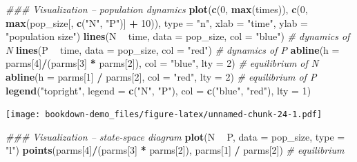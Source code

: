 \documentclass[
]{book}
\newenvironment{Shaded}{\begin{snugshade}}{\end{snugshade}}
\newcommand{\CommentTok}[1]{\textcolor[rgb]{0.56,0.35,0.01}{\textit{#1}}}
\newcommand{\DataTypeTok}[1]{\textcolor[rgb]{0.13,0.29,0.53}{#1}}
\newcommand{\DecValTok}[1]{\textcolor[rgb]{0.00,0.00,0.81}{#1}}
\newcommand{\KeywordTok}[1]{\textcolor[rgb]{0.13,0.29,0.53}{\textbf{#1}}}
\newcommand{\NormalTok}[1]{#1}
\newcommand{\OperatorTok}[1]{\textcolor[rgb]{0.81,0.36,0.00}{\textbf{#1}}}
\newcommand{\StringTok}[1]{\textcolor[rgb]{0.31,0.60,0.02}{#1}}
\begin{document}
\begin{Shaded}
\begin{Highlighting}[]
\CommentTok{### Visualization -- population dynamics}
\KeywordTok{plot}\NormalTok{(}\KeywordTok{c}\NormalTok{(}\DecValTok{0}\NormalTok{, }\KeywordTok{max}\NormalTok{(times)), }\KeywordTok{c}\NormalTok{(}\DecValTok{0}\NormalTok{, }\KeywordTok{max}\NormalTok{(pop_size[, }\KeywordTok{c}\NormalTok{(}\StringTok{"N"}\NormalTok{, }\StringTok{"P"}\NormalTok{)] }\OperatorTok{+}\StringTok{ }\DecValTok{10}\NormalTok{)), }\DataTypeTok{type =} \StringTok{"n"}\NormalTok{, }\DataTypeTok{xlab =} \StringTok{"time"}\NormalTok{, }\DataTypeTok{ylab =} \StringTok{"population size"}\NormalTok{)}
\KeywordTok{lines}\NormalTok{(N }\OperatorTok{~}\StringTok{ }\NormalTok{time, }\DataTypeTok{data =}\NormalTok{ pop_size, }\DataTypeTok{col =} \StringTok{"blue"}\NormalTok{) }\CommentTok{# dynamics of N}
\KeywordTok{lines}\NormalTok{(P }\OperatorTok{~}\StringTok{ }\NormalTok{time, }\DataTypeTok{data =}\NormalTok{ pop_size, }\DataTypeTok{col =} \StringTok{"red"}\NormalTok{) }\CommentTok{# dynamics of P}
\KeywordTok{abline}\NormalTok{(}\DataTypeTok{h =}\NormalTok{ parms[}\DecValTok{4}\NormalTok{]}\OperatorTok{/}\NormalTok{(parms[}\DecValTok{3}\NormalTok{] }\OperatorTok{*}\StringTok{ }\NormalTok{parms[}\DecValTok{2}\NormalTok{]), }\DataTypeTok{col =} \StringTok{"blue"}\NormalTok{, }\DataTypeTok{lty =} \DecValTok{2}\NormalTok{) }\CommentTok{# equilibrium of N}
\KeywordTok{abline}\NormalTok{(}\DataTypeTok{h =}\NormalTok{ parms[}\DecValTok{1}\NormalTok{] }\OperatorTok{/}\StringTok{ }\NormalTok{parms[}\DecValTok{2}\NormalTok{], }\DataTypeTok{col =} \StringTok{"red"}\NormalTok{, }\DataTypeTok{lty =} \DecValTok{2}\NormalTok{) }\CommentTok{# equilibrium of P}
\KeywordTok{legend}\NormalTok{(}\StringTok{"topright"}\NormalTok{, }\DataTypeTok{legend =} \KeywordTok{c}\NormalTok{(}\StringTok{"N"}\NormalTok{, }\StringTok{"P"}\NormalTok{), }\DataTypeTok{col =} \KeywordTok{c}\NormalTok{(}\StringTok{"blue"}\NormalTok{, }\StringTok{"red"}\NormalTok{), }\DataTypeTok{lty =} \DecValTok{1}\NormalTok{)}
\end{Highlighting}
\end{Shaded}

\texttt{[image: bookdown-demo\_files/figure-latex/unnamed-chunk-24-1.pdf]}

\begin{Shaded}
\begin{Highlighting}[]
\CommentTok{### Visualization -- state-space diagram}
\KeywordTok{plot}\NormalTok{(N }\OperatorTok{~}\StringTok{ }\NormalTok{P, }\DataTypeTok{data =}\NormalTok{ pop_size, }\DataTypeTok{type =} \StringTok{"l"}\NormalTok{)}
\KeywordTok{points}\NormalTok{(parms[}\DecValTok{4}\NormalTok{]}\OperatorTok{/}\NormalTok{(parms[}\DecValTok{3}\NormalTok{] }\OperatorTok{*}\StringTok{ }\NormalTok{parms[}\DecValTok{2}\NormalTok{]), parms[}\DecValTok{1}\NormalTok{] }\OperatorTok{/}\StringTok{ }\NormalTok{parms[}\DecValTok{2}\NormalTok{]) }\CommentTok{# equilibrium}
\end{Highlighting}
\end{Shaded}
\end{document}
